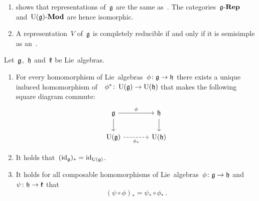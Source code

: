 \begin{remark}
  \leavevmode
  \begin{enumerate}
    \item
       shows that representations of~$\mathfrak{g}$ are the same as~{\modules{$\Univ(\glie)$}}.
      The categories~$\mathfrak{g}\text{-}\mathbf{Rep}$ and~$\operatorname{U}(\mathfrak{g})\text{-}\mathbf{Mod}$ are hence isomorphic.
    \item
      A representation~$V$ of~$\mathfrak{g}$ is completely reducible if and only if it is semisimple as an~{\module{$\Univ(\glie)$}}.
  \end{enumerate}
\end{remark}


\begin{lemma}
  \label{functoriality of universal enveloping algebra}
  Let~$\mathfrak{g}$,~$\mathfrak{h}$ and~$\mathfrak{k}$ be Lie~algebras.
  \begin{enumerate}
    \item
      For every homomorphism of Lie~algebras~$\phi \colon \mathfrak{g} \to \mathfrak{h}$ there exists a unique induced homomorphism of~\algebras{$\kf$}~$\phi^* \colon \operatorname{U}(\mathfrak{g}) \to \operatorname{U}(\mathfrak{h})$ that makes the following square diagram commute:
      \[
        \begin{tikzcd}[column sep = large]
          \glie
          \arrow{r}[above]{\phi}
          \arrow{d}
          &
          \hlie
          \arrow{d}
          \\
          \Univ(\glie)
          \arrow[dashed]{r}[below]{\phi_*}
          &
          \Univ(\hlie)
        \end{tikzcd}
      \]
    \item
      It holds that~$(\operatorname{id}_{\mathfrak{g}})_* = \operatorname{id}_{\operatorname{U}(\mathfrak{g})}$.
    \item
      It holds for all composable homomorphisms of Lie~algebras~$\phi \colon \mathfrak{g} \to \mathfrak{h}$ and~$\psi \colon \mathfrak{h} \to \mathfrak{k}$ that
      \[
        (\psi \circ \phi)_*
        =
        \psi_* \circ \phi_* \,.
      \]
  \end{enumerate}
\end{lemma}


